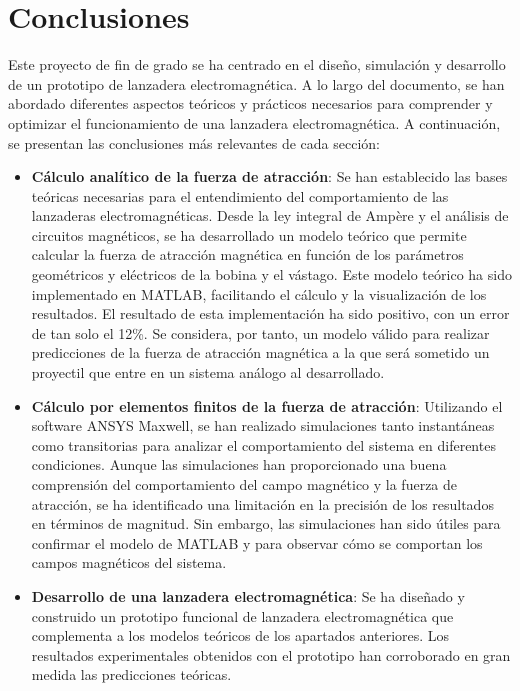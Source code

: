 \section{Conclusiones}
\label{sec:conclusiones}

Este proyecto de fin de grado se ha centrado en el diseño, simulación y desarrollo de un prototipo de lanzadera electromagnética. A lo largo del documento, se han abordado diferentes aspectos teóricos y prácticos necesarios para comprender y optimizar el funcionamiento de una lanzadera electromagnética. A continuación, se presentan las conclusiones más relevantes de cada sección:

\begin{itemize}
    \item \textbf{Cálculo analítico de la fuerza de atracción}: Se han establecido las bases teóricas necesarias para el entendimiento del comportamiento de las lanzaderas electromagnéticas. Desde la ley integral de Ampère y el análisis de circuitos magnéticos, se ha desarrollado un modelo teórico que permite calcular la fuerza de atracción magnética en función de los parámetros geométricos y eléctricos de la bobina y el vástago. Este modelo teórico ha sido implementado en MATLAB\textsuperscript{\textregistered}, facilitando el cálculo y la visualización de los resultados. El resultado de esta implementación ha sido positivo, con un error de tan solo el 12\%. Se considera, por tanto, un modelo válido para realizar predicciones de la fuerza de atracción magnética a la que será sometido un proyectil que entre en un sistema análogo al desarrollado.

    \item \textbf{Cálculo por elementos finitos de la fuerza de atracción}: Utilizando el software ANSYS Maxwell\textsuperscript{\textregistered}, se han realizado simulaciones tanto instantáneas como transitorias para analizar el comportamiento del sistema en diferentes condiciones. Aunque las simulaciones han proporcionado una buena comprensión del comportamiento del campo magnético y la fuerza de atracción, se ha identificado una limitación en la precisión de los resultados en términos de magnitud. Sin embargo, las simulaciones han sido útiles para confirmar el modelo de MATLAB\textsuperscript{\textregistered} y para observar cómo se comportan los campos magnéticos del sistema.

    \item \textbf{Desarrollo de una lanzadera electromagnética}: Se ha diseñado y construido un prototipo funcional de lanzadera electromagnética que complementa a los modelos teóricos de los apartados anteriores. Los resultados experimentales obtenidos con el prototipo han corroborado en gran medida las predicciones teóricas.
    

\end{itemize}
